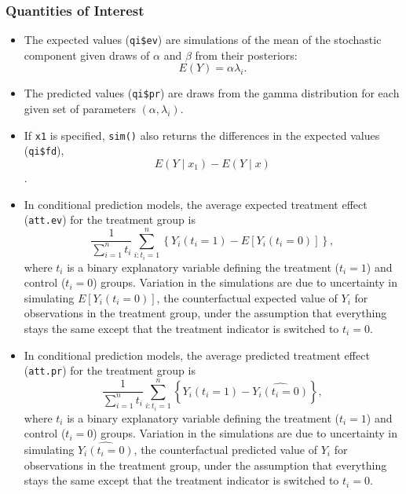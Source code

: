 \documentclass{article}
\begin{document}
\subsubsection{Quantities of Interest}

\begin{itemize}
\item The expected values ({\tt qi\$ev}) are simulations of the mean
  of the stochastic component given draws of $\alpha$ and
  $\beta$ from their posteriors:  $$E(Y) = \alpha \lambda_i.$$  
\item The predicted values ({\tt qi\$pr}) are draws from the gamma
  distribution for each given set of parameters $(\alpha, \lambda_i)$.
\item If {\tt x1} is specified, {\tt sim()} also returns the
  differences in the expected values ({\tt qi\$fd}), $$E(Y \mid x_1) -
  E(Y \mid x)$$.

\item In conditional prediction models, the average expected treatment
  effect ({\tt att.ev}) for the treatment group is 
    \begin{equation*} \frac{1}{\sum_{i=1}^n t_i}\sum_{i:t_i=1}^n \left\{ Y_i(t_i=1) -
      E[Y_i(t_i=0)] \right\},
    \end{equation*} 
    where $t_i$ is a binary explanatory variable defining the treatment
    ($t_i=1$) and control ($t_i=0$) groups.  Variation in the
    simulations are due to uncertainty in simulating $E[Y_i(t_i=0)]$,
    the counterfactual expected value of $Y_i$ for observations in the
    treatment group, under the assumption that everything stays the
    same except that the treatment indicator is switched to $t_i=0$.

\item In conditional prediction models, the average predicted treatment
  effect ({\tt att.pr}) for the treatment group is 
    \begin{equation*} \frac{1}{\sum_{i=1}^n t_i}\sum_{i:t_i=1}^n \left\{ Y_i(t_i=1) -
      \widehat{Y_i(t_i=0)} \right\},
    \end{equation*} 
    where $t_i$ is a binary explanatory variable defining the treatment
    ($t_i=1$) and control ($t_i=0$) groups.  Variation in the
    simulations are due to uncertainty in simulating
    $\widehat{Y_i(t_i=0)}$, the counterfactual predicted value of
    $Y_i$ for observations in the treatment group, under the
    assumption that everything stays the same except that the
    treatment indicator is switched to $t_i=0$.  

\end{itemize}
\end{document}
